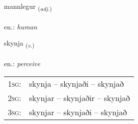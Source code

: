 \documentclass[frontgrid, backgrid]{flacards}\usepackage[]{graphicx}\usepackage[]{xcolor}
\begin{document}
\renewcommand{\flhead}{\vskip5pt \fboxsep=0pt {\small\bfseries\footnotesize Lýsingarorð | Adjective}}
\renewcommand{\fcfoot}{\vskip5pt \fboxsep=0pt \hspace{2pt}{\small\bfseries\footnotesize 2K}}

\renewcommand{\blhead}{\vskip5pt {\small\bfseries\footnotesize Lýsingarorð | Adjective }}
\renewcommand{\bcfoot}{\vskip5pt \hspace{2pt}{\small\bfseries\footnotesize 2K}}


{mannlegur \small{\textsubscript{(\textit{adj.})}} \\[1ex] %
\textphonetic{[manlɛɣʏr]} \\
en.: \emph{human} \\  [2ex]
\renewcommand*{\arraystretch}{0.8}
}

\renewcommand{\flhead}{\vskip5pt \fboxsep=0pt {\small\bfseries\footnotesize Sagnorð | Verb}}
\renewcommand{\fcfoot}{\vskip5pt \fboxsep=0pt \hspace{2pt}{\small\bfseries\footnotesize 2K}}

\renewcommand{\blhead}{\vskip5pt {\small\bfseries\footnotesize Sagnorð | Verb }}
\renewcommand{\bcfoot}{\vskip5pt \hspace{2pt}{\small\bfseries\footnotesize 2K}}


{skynja \small{\textsubscript{(\textit{v.})}} \\[1ex] %
\textphonetic{[scɪnja]} \\
en.: \emph{perceive} \\  [2ex]
\renewcommand*{\arraystretch}{0.8}
\begin{tabular}{p{1cm}l}
\textsc{1sg}: & skynja -- skynjaði -- skynjað \\ 
\textsc{2sg}: & skynjar -- skynjaðir -- skynjað \\ 
\textsc{3sg}: & skynjar -- skynjaði -- skynjað \\ 
\end{tabular}
}
\end{document}
